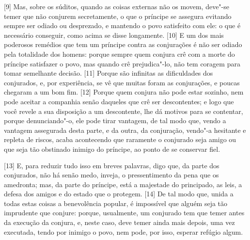 {[}9{]} Mas, sobre os súditos, quando as coisas externas não os movem,
deve"-se temer que não conjurem secretamente, o que o príncipe se
assegura evitando sempre ser odiado ou desprezado, e mantendo o povo
satisfeito com ele: o que é necessário conseguir, como acima se disse
longamente. {[}10{]} E um dos mais poderosos remédios que tem um
príncipe contra as conjurações é não ser odiado pela totalidade dos
homens: porque sempre quem conjura crê com a morte do príncipe
satisfazer o povo, mas quando crê prejudica"-lo, não tem coragem para
tomar semelhante decisão. {[}11{]} Porque são infinitas as dificuldades
dos conjurados, e, por experiência, se vê que muitas foram as
conjurações, e poucas chegaram a um bom fim. {[}12{]} Porque quem
conjura não pode estar sozinho, nem pode aceitar a companhia senão
daqueles que crê ser descontentes; e logo que você revele a sua
disposição a um descontente, lhe dá motivos para se contentar, porque
denunciando"-o, ele pode tirar vantagem, de tal modo que, vendo a
vantagem assegurada desta parte, e da outra, da conjuração, vendo"-a
hesitante e repleta de riscos, acaba acontecendo que raramente o
conjurado seja amigo ou que seja tão obstinado inimigo do príncipe, ao
ponto de se conservar fiel.

{[}13{]} E, para reduzir tudo isso em breves
palavras, digo que, da parte dos conjurados, não há senão medo, inveja,
o pressentimento da pena que os amedronta; mas, da parte do príncipe,
está a majestade do principado, as leis, a defesa dos amigos e do estado
que o protegem. {[}14{]} De tal modo que, unida a todas estas coisas a
benevolência popular, é impossível que alguém seja tão imprudente que
conjure: porque, usualmente, um conjurado tem que temer antes da
execução da conjura, e, neste caso, deve temer ainda mais depois, uma
vez executada, tendo por inimigo o povo, nem pode, por isso, esperar
refúgio algum.

